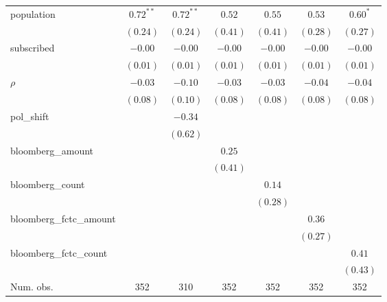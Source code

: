 \begin{table}[!h]
\begin{center}
\begin{tabular}{l c c c c c c }
population              & $0.72^{**}$  & $0.72^{**}$  & $0.52$       & $0.55$       & $0.53$       & $0.60^{*}$   \\
                        & $(0.24)$     & $(0.24)$     & $(0.41)$     & $(0.41)$     & $(0.28)$     & $(0.27)$     \\
subscribed              & $-0.00$      & $-0.00$      & $-0.00$      & $-0.00$      & $-0.00$      & $-0.00$      \\
                        & $(0.01)$     & $(0.01)$     & $(0.01)$     & $(0.01)$     & $(0.01)$     & $(0.01)$     \\
$\rho$                  & $-0.03$      & $-0.10$      & $-0.03$      & $-0.03$      & $-0.04$      & $-0.04$      \\
                        & $(0.08)$     & $(0.10)$     & $(0.08)$     & $(0.08)$     & $(0.08)$     & $(0.08)$     \\
pol\_shift              &              & $-0.34$      &              &              &              &              \\
                        &              & $(0.62)$     &              &              &              &              \\
bloomberg\_amount       &              &              & $0.25$       &              &              &              \\
                        &              &              & $(0.41)$     &              &              &              \\
bloomberg\_count        &              &              &              & $0.14$       &              &              \\
                        &              &              &              & $(0.28)$     &              &              \\
bloomberg\_fctc\_amount &              &              &              &              & $0.36$       &              \\
                        &              &              &              &              & $(0.27)$     &              \\
bloomberg\_fctc\_count  &              &              &              &              &              & $0.41$       \\
                        &              &              &              &              &              & $(0.43)$     \\
\midrule
Num. obs.               & 352          & 310          & 352          & 352          & 352          & 352          \\

\end{tabular}
\end{center}
\end{table}
